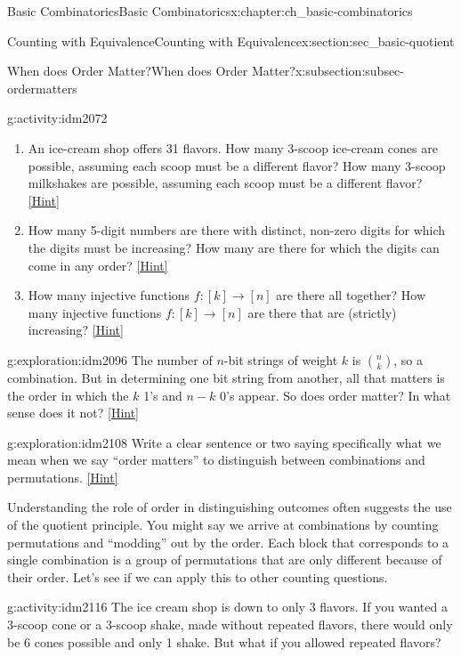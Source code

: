 \documentclass[oneside,10pt,]{book}
\numberwithin{equation}{chapter}
\begin{document}
\begin{chapterptx}{Basic Combinatorics}{}{Basic Combinatorics}{}{}{x:chapter:ch_basic-combinatorics}
\begin{sectionptx}{Counting with Equivalence}{}{Counting with Equivalence}{}{}{x:section:sec_basic-quotient}
\begin{subsectionptx}{When does Order Matter?}{}{When does Order Matter?}{}{}{x:subsection:subsec-ordermatters}
\begin{activity}{}{g:activity:idm2072}
\begin{enumerate}[font=\bfseries,label=(\alph*),ref=\alph*]
\item{}An ice-cream shop offers 31 flavors.  How many 3-scoop ice-cream cones are possible, assuming each scoop must be a different flavor?  How many 3-scoop milkshakes are possible, assuming each scoop must be a different flavor?%
\space\hspace*{0pt}\hfill{\tiny\hyperlink{g:hint:idm2078-back}{[Hint]}}\item{}How many 5-digit numbers are there with distinct, non-zero digits for which the digits must be increasing?  How many are there for which the digits can come in any order?%
\space\hspace*{0pt}\hfill{\tiny\hyperlink{g:hint:idm2083-back}{[Hint]}}\item{}How many injective functions \(f:[k] \to [n]\) are there all   together?  How many injective functions \(f:[k] \to [n]\) are there that are (strictly) increasing?%
\space\hspace*{0pt}\hfill{\tiny\hyperlink{g:hint:idm2093-back}{[Hint]}}\end{enumerate}
\end{activity}
\begin{exploration}{}{g:exploration:idm2096}%
The number of \(n\)-bit strings of weight \(k\) is \(\binom{n}{k}\), so a combination.  But in determining one bit string from another, all that matters is the order in which the \(k\) 1's and \(n-k\) 0's appear.  So does order matter?  In what sense does it not?%
\space\hspace*{0pt}\hfill{\tiny\hyperlink{g:hint:idm2104-back}{[Hint]}}\end{exploration}
\begin{exploration}{}{g:exploration:idm2108}%
Write a clear sentence or two saying specifically what we mean when we say ``order matters'' to distinguish between combinations and permutations.%
\space\hspace*{0pt}\hfill{\tiny\hyperlink{g:hint:idm2112-back}{[Hint]}}\end{exploration}
Understanding the role of order in distinguishing outcomes often suggests the use of the quotient principle.  You might say we arrive at combinations by counting permutations and ``modding'' out by the order.  Each block that corresponds to a single combination is a group of permutations that are only different because of their order.  Let's see if we can apply this to other counting questions.%
\begin{activity}{}{g:activity:idm2116}%
The ice cream shop is down to only 3 flavors.  If you wanted a 3-scoop cone or a 3-scoop shake, made without repeated flavors, there would only be 6 cones possible and only 1 shake.  But what if you allowed repeated flavors?%

\end{activity}
\end{subsectionptx}
\end{sectionptx}
\end{chapterptx}
\end{document}
